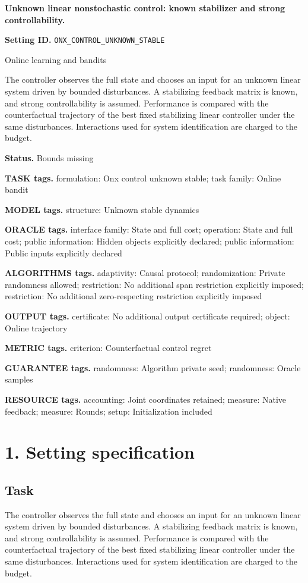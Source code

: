 \documentclass[10pt,a4paper]{article}
\begin{document}
\raggedright

{\LARGE\bfseries\sffamily\color{AtlasNavy} Unknown linear nonstochastic control: known stabilizer and strong controllability.\par}\vspace{5pt}
\textbf{Setting ID.} \texttt{ONX\_\allowbreak{}CONTROL\_\allowbreak{}UNKNOWN\_\allowbreak{}STABLE}

Online learning and bandits

The controller observes the full state and chooses an input for an unknown linear system driven by bounded disturbances. A stabilizing feedback matrix is known, and strong controllability is assumed. Performance is compared with the counterfactual trajectory of the best fixed stabilizing linear controller under the same disturbances. Interactions used for system identification are charged to the budget.

\textbf{Status.} Bounds missing

\textbf{TASK tags.} formulation: Onx control unknown stable; task family: Online bandit

\textbf{MODEL tags.} structure: Unknown stable dynamics

\textbf{ORACLE tags.} interface family: State and full cost; operation: State and full cost; public information: Hidden objects explicitly declared; public information: Public inputs explicitly declared

\textbf{ALGORITHMS tags.} adaptivity: Causal protocol; randomization: Private randomness allowed; restriction: No additional span restriction explicitly imposed; restriction: No additional zero-respecting restriction explicitly imposed

\textbf{OUTPUT tags.} certificate: No additional output certificate required; object: Online trajectory

\textbf{METRIC tags.} criterion: Counterfactual control regret

\textbf{GUARANTEE tags.} randomness: Algorithm private seed; randomness: Oracle samples

\textbf{RESOURCE tags.} accounting: Joint coordinates retained; measure: Native feedback; measure: Rounds; setup: Initialization included

\section{1. Setting specification}
\subsection{Task}
The controller observes the full state and chooses an input for an unknown linear system driven by bounded disturbances. A stabilizing feedback matrix is known, and strong controllability is assumed. Performance is compared with the counterfactual trajectory of the best fixed stabilizing linear controller under the same disturbances. Interactions used for system identification are charged to the budget.
\end{document}
